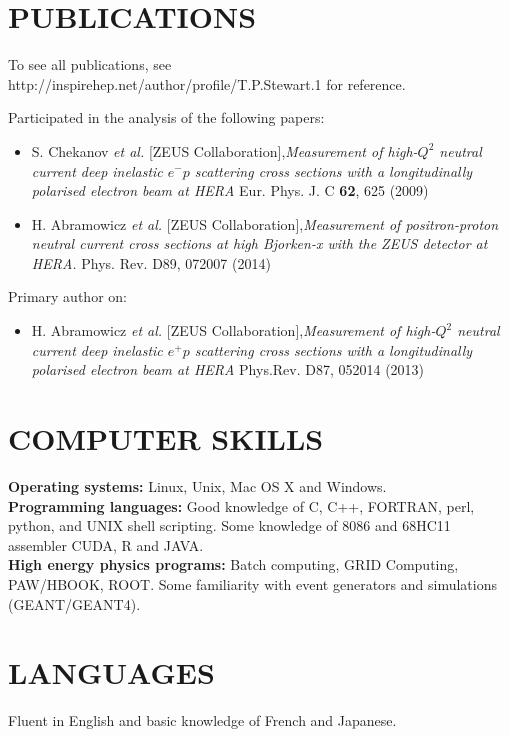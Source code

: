 \documentclass[margin]{res}
\begin{document}
\begin{resume}
\section{PUBLICATIONS}

To see all publications, see \\http://inspirehep.net/author/profile/T.P.Stewart.1 
for reference.

Participated in the analysis of the following papers:
\begin{itemize}
\item  S. Chekanov {\it et al.}  [ZEUS Collaboration],\textit{Measurement of high-$Q^2$ neutral current deep inelastic $e^- p$ scattering cross sections with a longitudinally polarised electron beam at HERA} Eur. Phys. J. C {\bf 62}, 625 (2009)
\item H. Abramowicz {\it et al.} [ZEUS Collaboration],\textit{Measurement of positron-proton neutral current cross sections at high Bjorken-x with the ZEUS detector at HERA.} Phys. Rev. D89, 072007 (2014)
\end{itemize}

Primary author on:
\begin{itemize}
\item H. Abramowicz {\it et al.} [ZEUS Collaboration],\textit{Measurement of high-$Q^2$ neutral current deep inelastic $e^+ p$ scattering cross sections with a longitudinally polarised electron beam at HERA} Phys.Rev. D87, 052014 (2013)
\end{itemize}

\section{COMPUTER SKILLS}

\textbf{Operating systems:} Linux, Unix, Mac OS X and Windows.\\
\textbf{Programming languages:} Good knowledge of C, C++, FORTRAN, perl, python, and UNIX shell scripting.  Some knowledge of 8086 and 68HC11 assembler CUDA, R and JAVA.\\
\textbf{High energy physics programs:} Batch computing, GRID Computing, PAW/HBOOK, ROOT.  Some familiarity with event generators and simulations (GEANT/GEANT4).

\section{LANGUAGES}

Fluent in English and basic knowledge of French and Japanese.


\end{resume}
\end{document}
